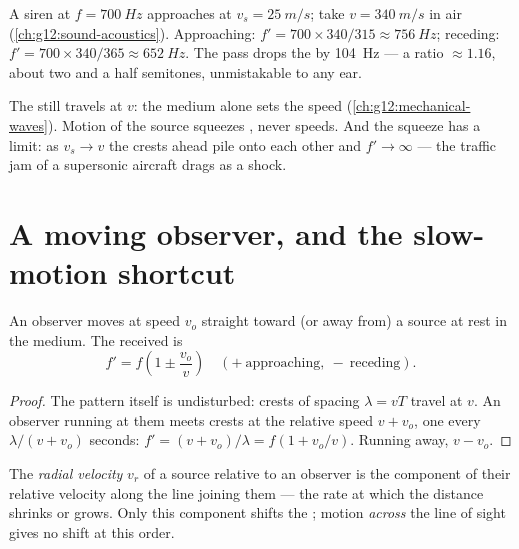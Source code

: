 \begin{example}\label{ex:g12:doppler-effect:siren}
A siren at $f = \qty{700}{Hz}$ approaches at $v_s = \qty{25}{m/s}$; take
$v = \qty{340}{m/s}$ in air (\cref{ch:g12:sound-acoustics}). Approaching:
$f' = 700 \times 340/315 \approx \qty{756}{Hz}$; receding:
$f' = 700 \times 340/365 \approx \qty{652}{Hz}$. The pass drops the  by \qty{104}{Hz}
--- a ratio $\approx 1.16$, about two and a half semitones, unmistakable to any ear.
\end{example}

\begin{remark}\label{rem:g12:doppler-effect:speed-unchanged}
The  still travels at $v$: the medium alone sets the speed
(\cref{ch:g12:mechanical-waves}). Motion of the source squeezes \emph{}, never
speeds. And the squeeze has a limit: as $v_s \to v$ the crests ahead pile onto each other
and $f' \to \infty$ --- the traffic jam of  a supersonic aircraft drags as a shock.
\end{remark}

\section{A moving observer, and the slow-motion shortcut}

\begin{proposition}\label{prop:g12:doppler-effect:moving-observer}
An observer moves at speed $v_o$ straight toward (or away from) a source at rest in the
medium. The received  is
\[ f' = f\left(1 \pm \frac{v_o}{v}\right) \quad (+\ \text{approaching},\ -\ \text{receding}). \]
\end{proposition}

\begin{proof}
The  pattern itself is undisturbed: crests of spacing $\lambda = vT$ travel at $v$. An
observer running at them meets crests at the relative speed $v + v_o$, one every
$\lambda/(v + v_o)$ seconds: $f' = (v + v_o)/\lambda = f(1 + v_o/v)$. Running away, $v - v_o$.
\end{proof}

\begin{definition}\label{def:g12:doppler-effect:radial}
The \emph{radial velocity} $v_r$ of a source relative to an
observer is the component of their relative velocity along the line joining them --- the
rate at which the distance shrinks or grows. Only this component shifts the ;
motion \emph{across} the line of sight gives no shift at this order.
\end{definition}

